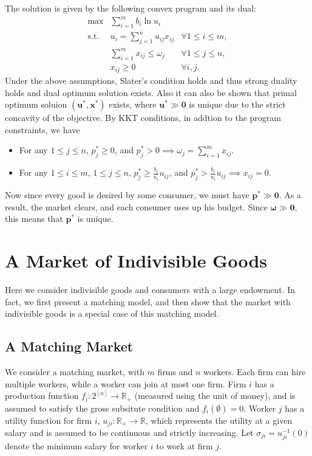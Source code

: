 \documentclass[openany]{book}
\theoremstyle{remark}
\begin{document}
The solution is given by the following convex program and its dual:
\begin{equation}
    \begin{array}{rll}
        \max & \sum_{i=1}^{m}b_i\ln u_i & \\
        \mathrm{s.t.} & u_i=\sum_{j=1}^{n}u_{ij}x_{ij} & \forall1\le i\le m, \\
         & \sum_{i=1}^{m}x_{ij}\le \omega_j & \forall1\le j\le n, \\
         & x_{ij}\ge0 & \forall i,j.
    \end{array}
\end{equation}
Under the above assumptions, Slater's condition holds and thus strong duality holds and dual optimum solution exists. Also it can also be shown that primal optimum soluion $(\boldsymbol{u}^*,\boldsymbol{x}^*)$ exists, where $\boldsymbol{u}^*\gg \mathbf{0}$ is unique due to the strict concavity of the objective. By KKT conditions, in addtion to the program constraints, we have
\begin{itemize}
    \item For any $1\le j\le n$, $p_j^*\ge0$, and $p_j^*>0\implies\omega_j=\sum_{i=1}^{m}x_{ij}$.
    \item For any $1\le i\le m$, $1\le j\le n$, $p_j^*\ge \frac{b_i}{u_i}u_{ij}$, and $p_j^*>\frac{b_i}{u_i}u_{ij}\implies x_{ij}=0$.
\end{itemize}

Now since every good is desired by some consumer, we must have $\boldsymbol{p}^*\gg \mathbf{0}$. As a result, the market clears, and each consumer uses up his budget. Since $\boldsymbol{\omega}\gg \mathbf{0}$, this means that $\boldsymbol{p}^*$ is unique.

\section{A Market of Indivisible Goods}
Here we consider indivisible goods and consumers with a large endowment. In fact, we first present a matching model, and then show that the market with indivisible goods is a special case of this matching model.

\subsection{A Matching Market}
We consider a matching market, with $m$ firms and $n$ workers. Each firm can hire multiple workers, while a worker can join at most one firm. Firm $i$ has a production function $f_i:2^{[n]}\to \mathbb{R}_+$ (measured using the unit of money), and is assumed to satisfy the gross subsitute condition and $f_i(\emptyset)=0$. Worker $j$ has a utility function for firm $i$, $u_{ji}:\mathbb{R}_+\to \mathbb{R}$, which represents the utility at a given salary and is assumed to be continuous and strictly increasing. Let $\sigma_{ji}=u_{ji}^{-1}(0)$ denote the minimum salary for worker $i$ to work at firm $j$.
\end{document}
